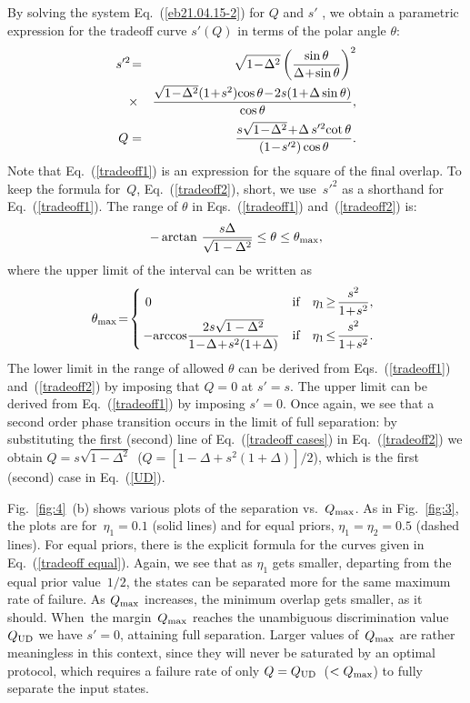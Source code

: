 \documentclass[aps,pra,twocolumn,showpacs]{revtex4-1}
\begin{document}
{By solving the system Eq.~(\ref{eb21.04.15-2}) for $Q$ and $s'$ , we obtain a parametric expression for the tradeoff curve $s'(Q)$ in terms of the polar angle $\theta$:
%
\begin{eqnarray}
s'^2\!&=&\!\sqrt{1\!-\!\Delta^2}\left({\sin\theta\over\Delta\!+\!\sin\theta}\right)^2\nonumber
\\
\!&\times&\!{\sqrt{1\!-\!\Delta^2}(1\!+\!s^2)\!\cos\theta\!-\!2s\!\left(1\!+\!\Delta \sin\theta\right)\over\cos\theta} ,
\label{tradeoff1}\\[.2em]
%
Q&=&\!{s\sqrt{1\!-\!\Delta^2}\!+\!\Delta\,s'^2\!\cot\theta\over(1\!-\!s'^2)\cos\theta}.
\label{tradeoff2}
\end{eqnarray}
%
Note that Eq.~(\ref{tradeoff1}) is an expression for the square of the final overlap. To keep the formula for~$Q$, Eq.~(\ref{tradeoff2}), 
short, we use~$s'^2$ as a shorthand for Eq.~(\ref{tradeoff1}). 
%
The range of $\theta$ in Eqs.~(\ref{tradeoff1}) and~(\ref{tradeoff2}) is:
$$
-\arctan\,{s\Delta\over\sqrt{1-\Delta^2}}\le\theta\le\theta_{\rm max},
$$
where the upper limit  of the interval can be written as
%
\begin{equation}
\theta_{\rm max}\!=\!\left\{
\!
\begin{array}{lll}
0&\mbox{if}&\displaystyle \eta_1\!\ge\!{s^2\over1\!+\!s^2},\\[.7em]
\displaystyle \!-\!\arccos\!{2s\sqrt{1-\Delta^2}\over1\!-\!\Delta\!+\!s^2(1\!+\!\Delta)}
&\mbox{if}&\displaystyle \eta_1\!\le\!{s^2\over1\!+\!s^2}.
\end{array}
\right.
\label{tradeoff cases}
\end{equation}
%
The lower limit  in the range of allowed $\theta$  can be derived from Eqs.~(\ref{tradeoff1}) and~(\ref{tradeoff2}) by imposing that $Q=0$ at $s'=s$. The upper limit can be derived from Eq.~(\ref{tradeoff1}) by imposing $s'=0$. Once again, we see that a second order phase transition occurs in the limit of full separation: by substituting the first (second) line of Eq.~(\ref{tradeoff cases}) in Eq.~(\ref{tradeoff2}) we obtain $Q=s\sqrt{1-\Delta^2}$\ ($Q=[1-\Delta+s^2(1+\Delta)]/2$), which is the first (second) case in Eq.~(\ref{UD}).

Fig.~\ref{fig:4}~(b) shows various plots of the separation vs.~$Q_{\rm max}$. As in Fig.~\ref{fig:3}, the plots are for~$\eta_1=0.1$ (solid lines) and for equal priors, $\eta_1=\eta_2=0.5$ (dashed lines). For equal priors, there is the explicit formula for the curves given in Eq.~(\ref{tradeoff equal}). Again, we see that as $\eta_1$ gets smaller, departing from the equal prior value~$1/2$, the states can be separated more for the same maximum rate of failure. As $Q_{\rm max}$ increases, the minimum overlap gets smaller, as it should. When~the margin~$Q_{\rm max}$ reaches the unambiguous discrimination value~$Q_{\rm UD}$ we have $s'=0$, attaining full separation. Larger values of~$Q_{\rm max}$ are rather meaningless in this context, since they will never be saturated by an optimal protocol, which requires  a failure rate of only $Q=Q_{\rm UD}$~($<Q_{\rm max}$) to fully separate the input states.

}
\end{document}
